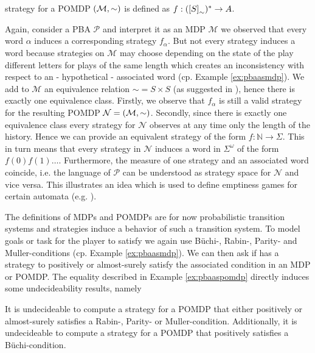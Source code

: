 strategy for a \ac{POMDP} $\left(\mathcal{M}, \sim\right)$ is defined as
$f:(\left[S\right]_{\sim})^{*}\rightarrow A$.
\begin{example}
  Again, consider a \ac{PBA} $\mathcal{P}$ and interpret it as an \ac{MDP}
  $\mathcal{M}$ we observed that every word $\alpha$ induces a corresponding
  strategy $f_{\alpha}$. But not every strategy induces a word because
  strategies on $\mathcal{M}$ may choose depending on the state of the play
  different letters for plays of the same length which creates an inconsistency
  with respect to an - hypothetical - associated word (cp. Example 
  \ref{ex:pbaasmdp}). We add to $\mathcal{M}$ an equivalence relation
  $\sim = S \times S$ (as suggested in \cite{DecProblemsForProbAuto}), hence 
  there is exactly one equivalence class.
  Firstly, we observe that $f_{\alpha}$ is still a valid strategy for the
  resulting \ac{POMDP} $\mathcal{N} = \left(\mathcal{M}, \sim\right)$. Secondly,
  since there is exactly one equivalence class every strategy for $\mathcal{N}$
  observes at any time only the length of the history. Hence we can provide an
  equivalent strategy of the form $f:\mathbb{N}\rightarrow \Sigma$. This
  in turn means that every strategy in $\mathcal{N}$ induces a word in
  $\Sigma^{\omega}$ of the form $f(0)f(1)\dots$. Furthermore, the
  measure of one strategy and an associated word coincide, i.e. the language of
  $\mathcal{P}$ can be understood as strategy space for $\mathcal{N}$ and vice
  versa. This illustrates an idea which is used to define emptiness games for
  certain automata (e.g. \cite[Proposition 45]{RandAutoInfTrees}).
  \label{ex:pbaaspomdp}
\end{example}
The definitions of \acp{MDP} and \acp{POMDP} are for now probabilistic 
transition systems and strategies induce a behavior of such a transition 
system. To model goals or task for the player to satisfy we again use 
Büchi-, Rabin-, Parity- and Muller-conditions (cp. Example \ref{ex:pbaasmdp}). 
We can then ask if \eve{} has a strategy to positively or almost-surely satisfy 
the associated condition in an \ac{MDP} or \ac{POMDP}. The equality described 
in Example \ref{ex:pbaaspomdp} directly induces some undecideability results, 
namely
\begin{corollary}
  \cite[Corollary 3 (a)]{DecProblemsForProbAuto}
  \cite[Theorem 5]{QualAnaPOMDP}
  It is undecideable to compute a strategy for a \ac{POMDP} that either 
  positively or almost-surely satisfies a Rabin-, Parity- or Muller-condition.
  Additionally, it is undecideable to compute a strategy for a \ac{POMDP} that
  positively satisfies a Büchi-condition.
  \label{cor:posstratpomdp}
\end{corollary}
